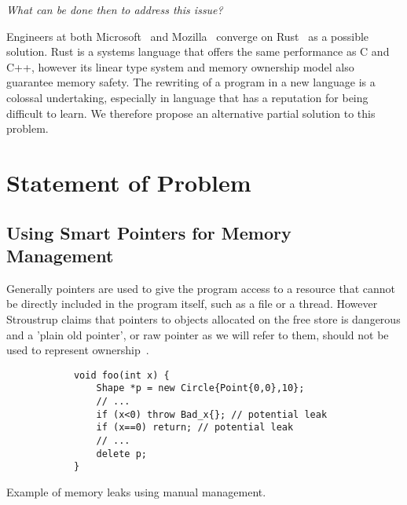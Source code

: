 \documentclass{proposal}
\begin{document}
    \emph{What can be done then to address this issue?}


    Engineers at both Microsoft~\cite{Thomas2019} and Mozilla~\cite{Hostfelt2019} converge on Rust~\cite{Balasubramanian2017} as a possible solution.
    Rust is a systems language that offers the same performance as C and C++, however its linear type system and memory ownership model also guarantee memory safety.
    The rewriting of a program in a new language is a colossal undertaking, especially in language that has a reputation for being difficult to learn.
    We therefore propose an alternative partial solution to this problem.




    \section{Statement of Problem}\label{sec:statement-of-problem}

    \subsection{Using Smart Pointers for Memory Management}\label{subsec:using-smart-pointers-for-memory-management}

    Generally pointers are used to give the program access to a resource that cannot be directly included in the program itself, such as a file or a thread.
    However Stroustrup claims that pointers to objects allocated on the free store is dangerous and a 'plain old pointer', or raw pointer as we will refer to them, should not be used to represent ownership~\cite{Stroustrup2018}.

    \begin{listing}
        \begin{verbatim}
            void foo(int x) {
                Shape *p = new Circle{Point{0,0},10};
                // ...
                if (x<0) throw Bad_x{}; // potential leak
                if (x==0) return; // potential leak
                // ...
                delete p;
            }
        \end{verbatim}
        \caption{Example of memory leaks using manual management.}
        \label{fig:manual-leak}
    \end{listing}
\end{document}

